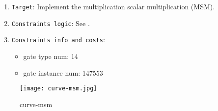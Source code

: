 
\begin{enumerate}
    \item \verb|Target|: Implement the multiplication scalar multiplication (MSM).
    \item \verb|Constraints logic|: See .
    \item \verb|Constraints info and costs|:
    \begin{itemize}
        \item gate type num: 14
        \item gate instance num: 147553
    \end{itemize}
\end{enumerate}

\begin{figure}[!ht]
    \centering
    \texttt{[image: curve-msm.jpg]}
    \caption{curve-msm}
    \label{fig:curve-msm}
\end{figure}
